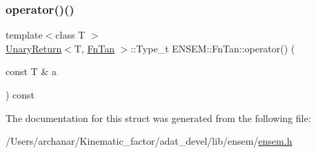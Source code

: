 \mbox{\label{structENSEM_1_1FnTan_ac94aaabe2436b8699faf802a7365e342}} 
\subsubsection{\texorpdfstring{operator()()}{operator()()}\hspace{0.1cm}{\footnotesize\ttfamily [2/2]}}
{\footnotesize\ttfamily template$<$class T $>$ \\
\mbox{\hyperlink{structENSEM_1_1UnaryReturn}{Unary\+Return}}$<$T, \mbox{\hyperlink{structENSEM_1_1FnTan}{Fn\+Tan}} $>$\+::Type\+\_\+t E\+N\+S\+E\+M\+::\+Fn\+Tan\+::operator() (\begin{DoxyParamCaption}\item[{const T \&}]{a }\end{DoxyParamCaption}) const\hspace{0.3cm}{\ttfamily [inline]}}



The documentation for this struct was generated from the following file\+:\begin{DoxyCompactItemize}
\item 
/\+Users/archanar/\+Kinematic\+\_\+factor/adat\+\_\+devel/lib/ensem/\mbox{\hyperlink{lib_2ensem_2ensem_8h}{ensem.\+h}}\end{DoxyCompactItemize}
